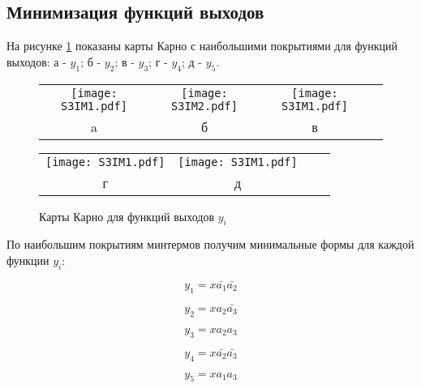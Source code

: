 \subsection{Минимизация функций выходов}

На рисунке \ref{fig:task3:karnaugh} показаны карты Карно с наибольшими покрытиями для функций выходов:
а - $y_1$; б - $y_2$; в - $y_3$; г - $y_4$; д - $y_5$.

\vspace{1em}

\begin{figure}[ht]
    \centering
    \begin{tabular}{cccc}
        \texttt{[image: S3IM1.pdf]} &
        \texttt{[image: S3IM2.pdf]} &
        \texttt{[image: S3IM1.pdf]} \\
        a & б & в \\[1em]
    \end{tabular}
    \begin{tabular}{cccc}
        \texttt{[image: S3IM1.pdf]} &
        \texttt{[image: S3IM1.pdf]} \\
        г & д \\[1em]
    \end{tabular}

    \caption{Карты Карно для функций выходов $y_i$}
    \label{fig:task3:karnaugh}
\end{figure}

По наибольшим покрытиям минтермов получим минимальные формы для каждой функции $y_i$:

\begin{equation}
    y_1 = x \bar{a_1} \bar{a_2}
    \label{eq:task3:formula1}
\end{equation}

\begin{equation}
    y_2 = x a_2 \bar{a_3}
\end{equation}

\begin{equation}
    y_3 = x a_2 a_3
\end{equation}

\begin{equation}
    y_4 = x \bar{a_2} \bar{a_3}
\end{equation}

\begin{equation}
    y_5 = x a_1 a_3
    \label{eq:task3:formula5}
\end{equation}

